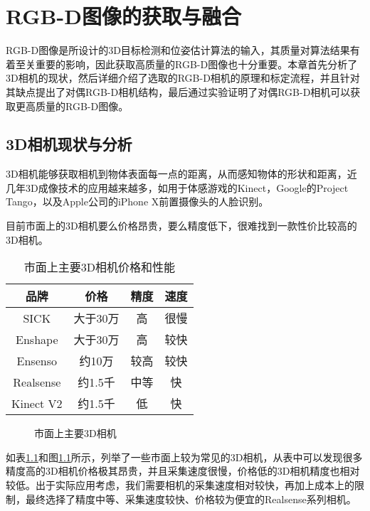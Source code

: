 \chapter{RGB-D图像的获取与融合}
\label{chap:rgbd}
RGB-D图像是所设计的3D目标检测和位姿估计算法的输入，其质量对算法结果有着至关重要的影响，因此获取高质量的RGB-D图像也十分重要。本章首先分析了3D相机的现状，然后详细介绍了选取的RGB-D相机的原理和标定流程，并且针对其缺点提出了对偶RGB-D相机结构，最后通过实验证明了对偶RGB-D相机可以获取更高质量的RGB-D图像。

\section{3D相机现状与分析}
3D相机能够获取相机到物体表面每一点的距离，从而感知物体的形状和距离，近几年3D成像技术的应用越来越多，如用于体感游戏的Kinect\cite{kinect}，Google的Project Tango\cite{tango}，以及Apple公司的iPhone X前置摄像头的人脸识别。

目前市面上的3D相机要么价格昂贵，要么精度低下，很难找到一款性价比较高的3D相机。
\begin{table}[ht]
  \centering
  \caption{市面上主要3D相机价格和性能}
  \begin{tabular}{cccc}
    \toprule
    品牌&价格&精度&速度 \\
    \midrule
    SICK&大于30万&高&很慢 \\
    Enshape&大于30万&高&较快 \\
    Ensenso&约10万&较高&较快 \\
    Realsense&约1.5千&中等&快 \\
    Kinect V2&约1.5千&低&快\\
    \bottomrule
  \end{tabular}
  \label{tab:3d_camera}
\end{table}
\begin{figure}[ht]
  \centering
  \caption{市面上主要3D相机}
  \label{fig:3d_camera}
\end{figure}
如表\ref{tab:3d_camera}和图\ref{fig:3d_camera}所示，列举了一些市面上较为常见的3D相机，从表中可以发现很多精度高的3D相机价格极其昂贵，并且采集速度很慢，价格低的3D相机精度也相对较低。出于实际应用考虑，我们需要相机的采集速度相对较快，再加上成本上的限制，最终选择了精度中等、采集速度较快、价格较为便宜的Realsense系列相机。


